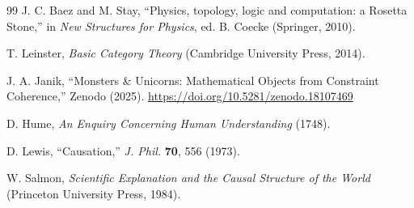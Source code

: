 \documentclass[11pt,a4paper]{article}
\begin{document}
\begin{thebibliography}{99}
J. C. Baez and M. Stay, ``Physics, topology, logic and computation: a Rosetta Stone,'' in \textit{New Structures for Physics}, ed. B. Coecke (Springer, 2010).

T. Leinster, \textit{Basic Category Theory} (Cambridge University Press, 2014).

J. A. Janik, ``Monsters \& Unicorns: Mathematical Objects from Constraint Coherence,'' Zenodo (2025). \url{https://doi.org/10.5281/zenodo.18107469}

D. Hume, \textit{An Enquiry Concerning Human Understanding} (1748).

D. Lewis, ``Causation,'' \textit{J. Phil.} \textbf{70}, 556 (1973).

W. Salmon, \textit{Scientific Explanation and the Causal Structure of the World} (Princeton University Press, 1984).

\end{thebibliography}
\end{document}
